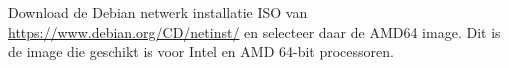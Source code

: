 Download de Debian netwerk installatie ISO van \url{https://www.debian.org/CD/netinst/} en selecteer daar de AMD64 image. Dit is de image die geschikt is voor Intel en AMD 64-bit processoren.


